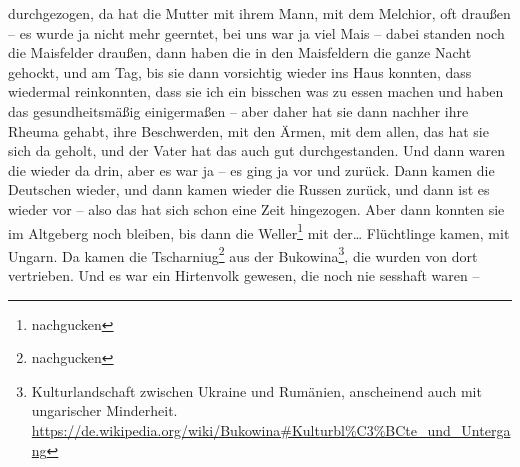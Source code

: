 \documentclass[ngerman,]{article}
\begin{document}
\begin{multicols}{3}
\begin{description}
durchgezogen, da hat die Mutter mit ihrem Mann, mit dem Melchior, oft
draußen – es wurde ja nicht mehr geerntet, bei uns war ja viel Mais –
dabei standen noch die Maisfelder draußen, dann haben die in den
Maisfeldern die ganze Nacht gehockt, und am Tag, bis sie dann vorsichtig
wieder ins Haus konnten, dass wiedermal reinkonnten, dass sie ich ein
bisschen was zu essen machen und haben das gesundheitsmäßig einigermaßen
– aber daher hat sie dann nachher ihre Rheuma gehabt, ihre Beschwerden,
mit den Ärmen, mit dem allen, das hat sie sich da geholt, und der Vater
hat das auch gut durchgestanden. Und dann waren die wieder da drin, aber
es war ja – es ging ja vor und zurück. Dann kamen die Deutschen wieder,
und dann kamen wieder die Russen zurück, und dann ist es wieder vor –
also das hat sich schon eine Zeit hingezogen. Aber dann konnten sie im
Altgeberg noch bleiben, bis dann die Weller\footnote{nachgucken} mit
der\ldots{} Flüchtlinge kamen, mit Ungarn. Da kamen die
Tscharniug\footnote{nachgucken} aus der Bukowina\footnote{Kulturlandschaft
  zwischen Ukraine und Rumänien, anscheinend auch mit ungarischer
  Minderheit.
  \url{https://de.wikipedia.org/wiki/Bukowina\#Kulturbl\%C3\%BCte_und_Untergang}},
die wurden von dort vertrieben. Und es war ein Hirtenvolk gewesen, die
noch nie sesshaft waren –
\end{description}


\end{multicols}
\end{document}

